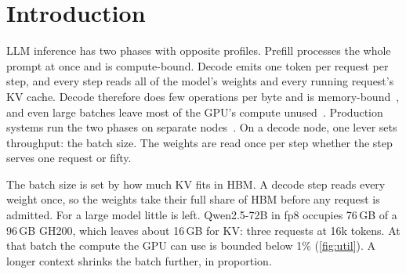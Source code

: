 
\section{Introduction}\label{sec:intro}

LLM inference has two phases with opposite profiles. Prefill processes the
whole prompt at once and is compute-bound. Decode emits one token per request
per step, and every step reads all of the model's weights and every running
request's KV cache. Decode therefore does few operations per byte and is
memory-bound~\cite{splitwise}, and even large batches leave most of the GPU's
compute unused~\cite{mindgap}. Production systems run the two phases on
separate nodes~\cite{distserve,splitwise,mooncake}. On a decode node, one
lever sets throughput: the batch size. The weights are read once per step
whether the step serves one request or fifty.

The batch size is set by how much KV fits in HBM. A decode step reads every
weight once, so the weights take their full share of HBM before any request
is admitted. For a large model little is left. Qwen2.5-72B in fp8 occupies
76\,GB of a 96\,GB GH200, which leaves about 16\,GB for KV: three requests at
16k tokens. At that batch the compute the GPU can use is bounded below 1\%
(\cref{fig:util}). A longer context shrinks the batch further, in proportion.

